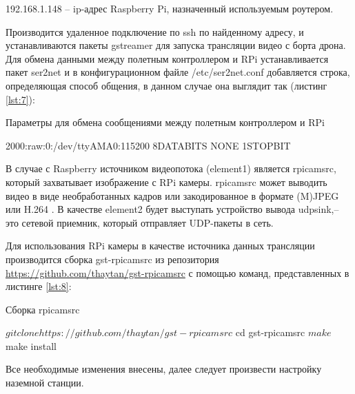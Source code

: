 192.168.1.148 -- ip-адрес Raspberry Pi, назначенный используемым роутером.

Производится удаленное подключение по ssh по найденному адресу, и устанавливаются пакеты gstreamer для запуска трансляции видео с борта дрона.
Для обмена данными между полетным контроллером и RPi устанавливается пакет ser2net и в конфигурационном файле /etc/ser2net.conf добавляется строка, определяющая способ общения, в данном случае она выглядит так (листинг \ref{lst:7}):
\begin{Program}[H]
\caption{Параметры для обмена сообщениями между полетным контроллером и RPi} \label{lst:7}
	\begin{MyCode}
	2000:raw:0:/dev/ttyAMA0:115200 8DATABITS NONE 1STOPBIT
	\end{MyCode}
\end{Program}

В случае с Raspberry источником видеопотока (element1) является rpi\-cam\-src, который захватывает изображение с RPi камеры. rpi\-cam\-src может выводить видео в виде необработанных кадров или закодированное в формате (M)JPEG или H.264 \cite{gstreamer1}. В качестве element2 будет выступать устройство вывода udpsink,-- это сетевой приемник, который отправляет UDP-пакеты в сеть.

Для использования RPi камеры в качестве источника данных трансляции производится сборка gst-rpicamsrc из репозитория \url{https://github.com/thaytan/gst-rpicamsrc} с помощью команд, представленных в листинге \ref{lst:8}:
\begin{Program}[H]
\caption{Сборка rpicamsrc} \label{lst:8}
\begin{MyCode}
$ git clone https://github.com/thaytan/gst-rpicamsrc
$ cd gst-rpicamsrc
$ make
$ make install
\end{MyCode}
\end{Program}


Все необходимые изменения внесены, далее следует произвести настройку наземной станции.

